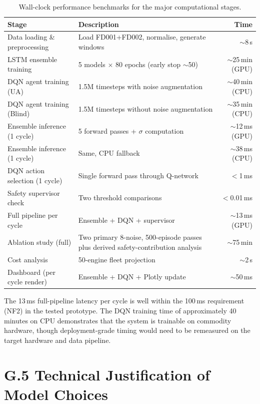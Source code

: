 \documentclass[12pt,a4paper]{report}
\begin{document}
\begin{table}[h]
\centering
\small
\caption{Wall-clock performance benchmarks for the major computational stages.}
\label{tab:app_perf_benchmarks}
\renewcommand{\arraystretch}{1.3}
\begin{tabularx}{\textwidth}{@{}l X r@{}}
\toprule
\textbf{Stage} & \textbf{Description} & \textbf{Time} \\
\midrule
Data loading \& preprocessing & Load FD001+FD002, normalise, generate windows & $\sim$8\,s \\
LSTM ensemble training & 5 models $\times$ 80 epochs (early stop $\sim$50) & $\sim$25\,min (GPU) \\
DQN agent training (UA) & 1.5M timesteps with noise augmentation & $\sim$40\,min (CPU) \\
DQN agent training (Blind) & 1.5M timesteps without noise augmentation & $\sim$35\,min (CPU) \\
\midrule
Ensemble inference (1 cycle) & 5 forward passes + $\sigma$ computation & $\sim$12\,ms (GPU) \\
Ensemble inference (1 cycle) & Same, CPU fallback & $\sim$38\,ms (CPU) \\
DQN action selection (1 cycle) & Single forward pass through Q-network & $<$1\,ms \\
Safety supervisor check & Two threshold comparisons & $<$0.01\,ms \\
Full pipeline per cycle & Ensemble + DQN + supervisor & $\sim$13\,ms (GPU) \\
\midrule
Ablation study (full) & Two primary 8-noise, 500-episode passes plus derived safety-contribution analysis & $\sim$75\,min \\
Cost analysis & 50-engine fleet projection & $\sim$2\,s \\
Dashboard (per cycle render) & Ensemble + DQN + Plotly update & $\sim$50\,ms \\
\bottomrule
\end{tabularx}
\end{table}

The 13\,ms full-pipeline latency per cycle is well within the 100\,ms requirement (NF2) in the tested prototype. The DQN training time of approximately 40 minutes on CPU demonstrates that the system is trainable on commodity hardware, though deployment-grade timing would need to be remeasured on the target hardware and data pipeline.

\section*{G.5 Technical Justification of Model Choices}
\end{document}
